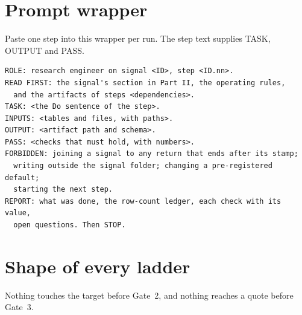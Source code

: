 \documentclass[11pt,letterpaper]{article}
\begin{document}
\section{Prompt wrapper}
Paste one step into this wrapper per run. The step text supplies TASK, OUTPUT and PASS.
\begin{verbatim}
ROLE: research engineer on signal <ID>, step <ID.nn>.
READ FIRST: the signal's section in Part II, the operating rules,
  and the artifacts of steps <dependencies>.
TASK: <the Do sentence of the step>.
INPUTS: <tables and files, with paths>.
OUTPUT: <artifact path and schema>.
PASS: <checks that must hold, with numbers>.
FORBIDDEN: joining a signal to any return that ends after its stamp;
  writing outside the signal folder; changing a pre-registered default;
  starting the next step.
REPORT: what was done, the row-count ledger, each check with its value,
  open questions. Then STOP.
\end{verbatim}

\section{Shape of every ladder}
\begin{center}
\end{center}
Nothing touches the target before Gate~2, and nothing reaches a quote before Gate~3.
\end{document}
